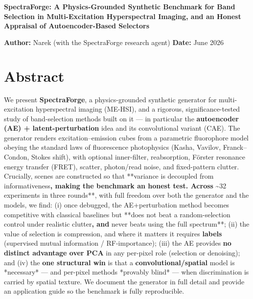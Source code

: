 \documentclass[11pt]{article}
\begin{document}
\begin{center}{\LARGE\bfseries SpectraForge: A Physics-Grounded Synthetic Benchmark for Band Selection in Multi-Excitation Hyperspectral Imaging, and an Honest Appraisal of Autoencoder-Based Selectors}\end{center}\vspace{1em}
\textbf{Author:} Narek (with the SpectraForge research agent)
\textbf{Date:} June 2026
\section*{Abstract}
We present \textbf{SpectraForge}, a physics-grounded synthetic generator for multi-excitation hyperspectral
imaging (ME-HSI), and a rigorous, significance-tested study of band-selection methods built on it — in
particular the \textbf{autoencoder (AE) + latent-perturbation} idea and its convolutional variant (CAE). The
generator renders excitation–emission cubes from a parametric fluorophore model obeying the standard
laws of fluorescence photophysics (Kasha, Vavilov, Franck–Condon, Stokes shift), with optional
inner-filter, reabsorption, Förster resonance energy transfer (FRET), scatter, photon/read noise, and
fixed-pattern clutter. Crucially, scenes are constructed so that **variance is decoupled from
informativeness\textbf{, making the benchmark an honest test. Across }\textasciitilde{}32 experiments in three rounds**, with
full freedom over both the generator and the models, we find: (i) once debugged, the AE+perturbation
method becomes competitive with classical baselines but **does not beat a random-selection control under
realistic clutter\textbf{, and }never beats using the full spectrum**; (ii) the value of selection is
compression, and where it matters it requires \textbf{labels} (supervised mutual information / RF-importance);
(iii) the AE provides \textbf{no distinct advantage over PCA} in any per-pixel role (selection or denoising);
and (iv) the \textbf{one structural win} is that a \textbf{convolutional/spatial} model is *necessary* — and
per-pixel methods *provably blind* — when discrimination is carried by spatial texture. We document the
generator in full detail and provide an application guide so the benchmark is fully reproducible.
\end{document}
